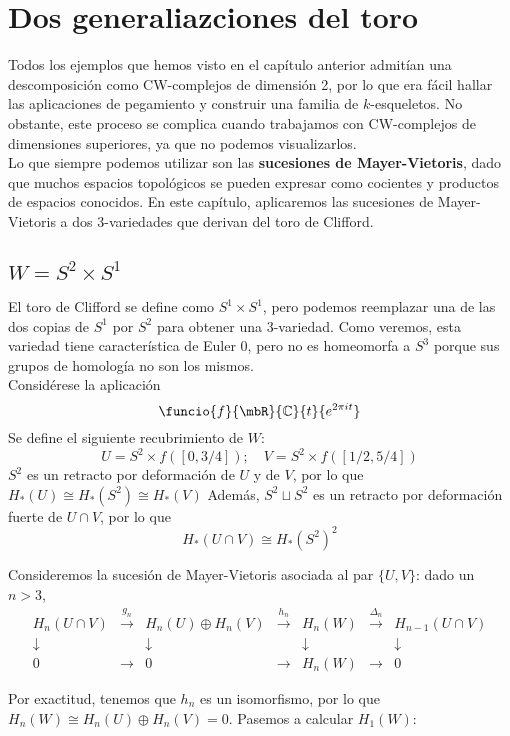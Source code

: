 \chapter{Dos generaliazciones del toro}
Todos los ejemplos que hemos visto en el capítulo anterior admitían una descomposición como CW-complejos de dimensión 2, por lo que era fácil hallar las aplicaciones de pegamiento y construir una familia de $k$-esqueletos. No obstante, este proceso se complica cuando trabajamos con CW-complejos de dimensiones superiores, ya que no podemos visualizarlos.
\\

Lo que siempre podemos utilizar son las \textbf{sucesiones de Mayer-Vietoris}, dado que muchos espacios topológicos se pueden expresar como cocientes y productos de espacios conocidos. En este capítulo, aplicaremos las sucesiones de Mayer-Vietoris a dos 3-variedades que derivan del toro de Clifford.

\section{$W=S^2\times S^1$}
El toro de Clifford se define como $S^1\times S^1$, pero podemos reemplazar una de las dos copias de $S^1$ por $S^2$ para obtener una 3-variedad. Como veremos, esta variedad tiene característica de Euler 0, pero no es homeomorfa a $S^3$ porque sus grupos de homología no son los mismos.
\\

Considérese la aplicación \[\funcio{f}{\mbR}{\mb{C}}{t}{e^{2\pi i t}}\] Se define el siguiente recubrimiento de $W$: \[U=S^2\times f([0,3/4]); \quad V=S^2 \times f([1/2,5/4])\] $S^2$ es un retracto por deformación de $U$ y de $V$, por lo que $H_*(U)\cong H_*(S^2)\cong H_*(V)$ Además, $S^2\sqcup S^2$ es un retracto por deformación fuerte de $U\cap V$, por lo que $$H_*(U\cap V)\cong H_*(S^2)^2$$

Consideremos la sucesión de Mayer-Vietoris asociada al par $\{U,V\}$: dado un $n > 3$,
\[\begin{array}{ccccccc}
H_n(U\cap V)&\xrightarrow{g_n}&H_n(U)\oplus H_n(V)	&\xrightarrow{h_n}	&H_n(W)		&\xrightarrow{\Delta_n}&H_{n-1}(U \cap V)\\
\downarrow&&\downarrow			&					&\downarrow	&					&\downarrow\\
0& \rightarrow&0			&\rightarrow			&H_n(W)		&\rightarrow			&0
\end{array}\]

Por exactitud, tenemos que $h_n$ es un isomorfismo, por lo que $H_n(W) \cong H_n(U)\oplus H_n(V)=0$. Pasemos a calcular $H_1(W)$:

